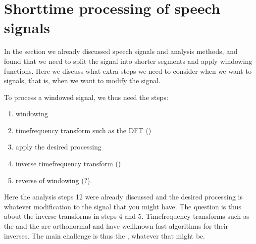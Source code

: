 \documentclass[letterpaper,10pt,english]{jupyterBook}
\begin{document}
\sphinxstepscope


\section{Short\sphinxhyphen{}time processing of speech signals}
\label{\detokenize{Representations/Short-time_processing:short-time-processing-of-speech-signals}}\label{\detokenize{Representations/Short-time_processing::doc}}
\sphinxAtStartPar
In the  section we already discussed speech signals and analysis methods, and found that we need to split the signal into shorter segments and apply windowing functions. Here we discuss what extra steps we need to consider when we want to  signals, that is, when we want to modify the signal.

\sphinxAtStartPar
To process a windowed signal, we thus need the steps:
\begin{enumerate}
%
\item {} 
\sphinxAtStartPar
windowing

\item {} 
\sphinxAtStartPar
time\sphinxhyphen{}frequency transform such as the DFT ()

\item {} 
\sphinxAtStartPar
apply the desired processing

\item {} 
\sphinxAtStartPar
inverse time\sphinxhyphen{}frequency transform ()

\item {} 
\sphinxAtStartPar
reverse of windowing (?).

\end{enumerate}

\sphinxAtStartPar
Here the analysis steps 1\sphinxhyphen{}2 were already discussed and the desired processing is whatever modification to the signal that you might have. The question is thus about the inverse transforms in steps 4 and 5.
Time\sphinxhyphen{}frequency transforms such as the  and the  are orthonormal and have well\sphinxhyphen{}known fast algorithms for their inverses. The main challenge is thus the , whatever that might be.
\end{document}
